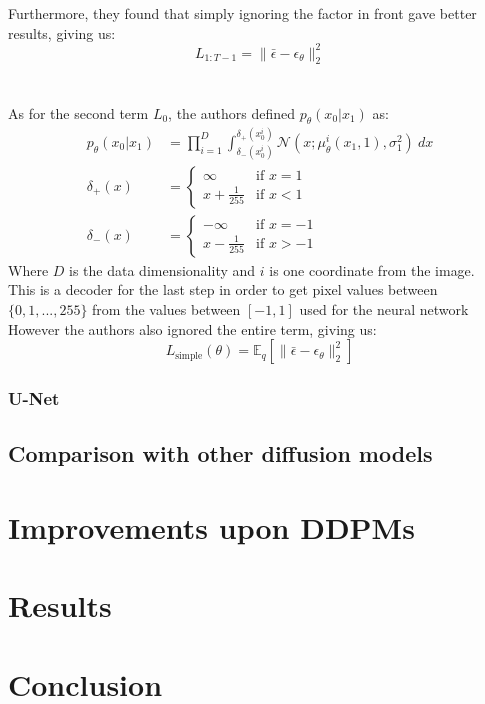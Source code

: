 \documentclass{article}
\begin{document}
Furthermore, they found that simply ignoring the factor in front gave better results, giving us:
\begin{equation}
  L_{1:T-1} = \| \bar{\epsilon} - \epsilon_\theta \|_2^2
\end{equation}
\\\\
As for the second term $L_0$, the authors defined $p_\theta(x_0 | x_1)$ as:
\begin{align}
  p_\theta(x_0 | x_1) &= \prod_{i=1}^{D} \int_{\delta_{-} (x_0^i)}^{\delta_{+} (x_0^i)} \mathcal{N}(x; \mu_\theta^i (x_1, 1), \sigma^2_1) \: dx \\
  \delta_{+} (x) &= \begin{cases}
    \infty & \text{if } x = 1 \\
    x + \frac{1}{255} & \text{if } x < 1 
  \end{cases}\\
  \delta_{-} (x) &= \begin{cases}
    - \infty & \text{if } x = - 1 \\
    x - \frac{1}{255} & \text{if } x > -1 
  \end{cases}
\end{align}
Where $D$ is the data dimensionality and $i$ is one coordinate from the image. \\
This is a decoder for the last step in order to get pixel values between $\{0, 1, ..., 255 \}$ from the values between $[-1, 1]$ used for the neural network \cite{ho2020denoising,nichol2021improved} \\
However the authors also ignored the entire term, giving us:
\begin{equation}
  L_{\text{simple}}(\theta) = \mathbb{E}_q \left[ \| \bar{\epsilon} - \epsilon_\theta \|_2^2 \right]
\end{equation}
\subsubsection{U-Net}


\subsection{Comparison with other diffusion models}

\newpage
\section{Improvements upon DDPMs}

\newpage
\section{Results}

\newpage
\section{Conclusion}


\newpage
\printbibliography
\end{document}
